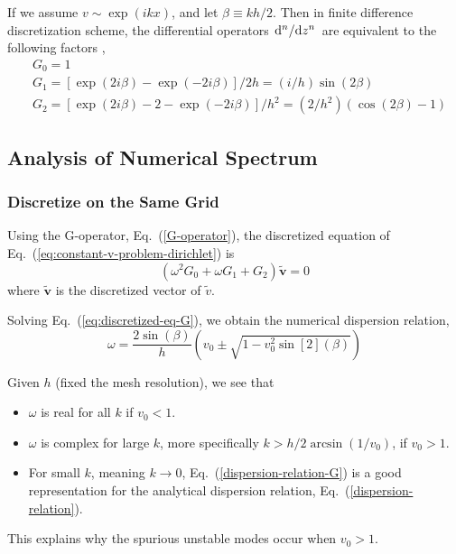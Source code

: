 If we assume $v\sim \exp(ikx)$, and let $\beta\equiv kh/2$. Then in finite difference discretization scheme, the differential operators $\dv*[n]{z}$ are equivalent to the following factors \cite{llobet_spectral_1990},
\begin{align}
	 & G_0 = 1 \nonumber                                                              \\
	 & G_1 = [\exp(2i\beta)-\exp(-2i\beta)]/2h = (i/h)\sin(2\beta)
	\label{G-operator}                                                                \\
	 & G_2 = [\exp(2i\beta)-2-\exp(-2i\beta)]/h^2 = (2/h^2)(\cos(2\beta)-1) \nonumber
\end{align}


\subsection{Analysis of Numerical Spectrum}
\subsubsection{Discretize on the Same Grid}
Using the G-operator, Eq.~(\ref{G-operator}), the discretized equation of Eq.~(\ref{eq:constant-v-problem-dirichlet}) is
\begin{equation} \label{eq:discretized-eq-G}
	(\omega^2G_0 + \omega G_1 + G_2)\mathbf{\tilde{v}} = 0
\end{equation}
where $\mathbf{\tilde{v}}$ is the discretized vector of $\tilde{v}$.

Solving Eq.~(\ref{eq:discretized-eq-G}), we obtain the numerical dispersion relation,
\begin{equation} \label{dispersion-relation-G}
	\omega = \frac{2\sin(\beta)}{h}\left(v_0 \pm \sqrt{1 - v_0^2\sin[2](\beta)}\right)
\end{equation}

Given $h$ (fixed the mesh resolution), we see that
\begin{itemize}
	\item $\omega$ is real for all $k$ if $v_0 < 1$.
	\item $\omega$ is complex for large $k$, more specifically $k>h/2\arcsin(1/v_0)$, if $v_0 > 1$.
	\item For small $k$, meaning $k\to 0$, Eq.~(\ref{dispersion-relation-G}) is a good representation for the analytical dispersion relation, Eq.~(\ref{dispersion-relation}).
\end{itemize}
This explains why the spurious unstable modes occur when $v_0>1$.

